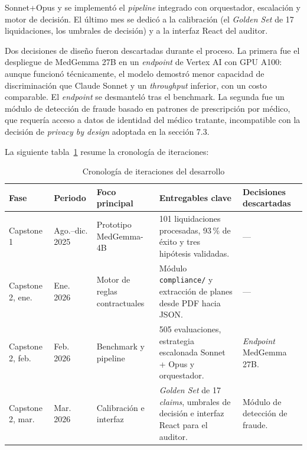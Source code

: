 Sonnet+Opus y se implementó el \textit{pipeline} integrado con orquestador, escalación y motor de decisión. El último mes se dedicó a la calibración (el \textit{Golden Set} de 17 liquidaciones, los umbrales de decisión) y a la interfaz React del auditor.

Dos decisiones de diseño fueron descartadas durante el proceso. La primera fue el despliegue de MedGemma 27B en un \textit{endpoint} de Vertex AI con GPU A100: aunque funcionó técnicamente, el modelo demostró menor capacidad de discriminación que Claude Sonnet y un \textit{throughput} inferior, con un costo comparable. El \textit{endpoint} se desmanteló tras el benchmark. La segunda fue un módulo de detección de fraude basado en patrones de prescripción por médico, que requería acceso a datos de identidad del médico tratante, incompatible con la decisión de \textit{privacy by design}  adoptada en la sección 7.3.

La siguiente tabla~\ref{tab:cronologia-desarrollo} resume la cronología de iteraciones:

\begin{table}[H]
    \centering
    \caption{Cronología de iteraciones del desarrollo}
    \label{tab:cronologia-desarrollo}

    \scriptsize
    \setlength{\tabcolsep}{4pt}
    \renewcommand{\arraystretch}{1.25}

    \begin{tabular}{
        p{}
        p{}
        p{}
        p{}
        p{}
    }
        \toprule
        \textbf{Fase}
        & \textbf{Periodo}
        & \textbf{Foco principal}
        & \textbf{Entregables clave}
        & \textbf{Decisiones descartadas} \\
        \midrule

        Capstone 1
        & Ago.--dic. 2025
        & Prototipo MedGemma-4B
        & 101 liquidaciones procesadas, 93\,\% de éxito y tres
          hipótesis validadas.
        & --- \\

        Capstone 2, ene.
        & Ene. 2026
        & Motor de reglas contractuales
        & Módulo \texttt{compliance/} y extracción de planes desde
          PDF hacia JSON.
        & --- \\

        Capstone 2, feb.
        & Feb. 2026
        & Benchmark y pipeline
        & 505 evaluaciones, estrategia escalonada Sonnet + Opus
          y orquestador.
        & \textit{Endpoint} MedGemma 27B. \\

        Capstone 2, mar.
        & Mar. 2026
        & Calibración e interfaz
        & \textit{Golden Set} de 17 \textit{claims}, umbrales de
          decisión e interfaz React para el auditor.
        & Módulo de detección de fraude. \\

        \bottomrule
    \end{tabular}
\end{table}
